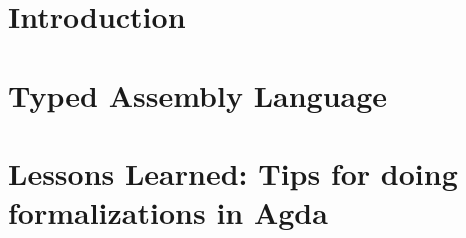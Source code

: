 




\begin{titlepage}
\maketitle
\end{titlepage}
\tableofcontents



\chapter{Introduction}




\chapter{Typed Assembly Language}


\chapter{Lessons Learned: Tips for doing formalizations in Agda}


% 
% 
% 
% 
% 
% 
% 

% 
% 
% 
% 
% 
% 

\listoftodos[Notes]




